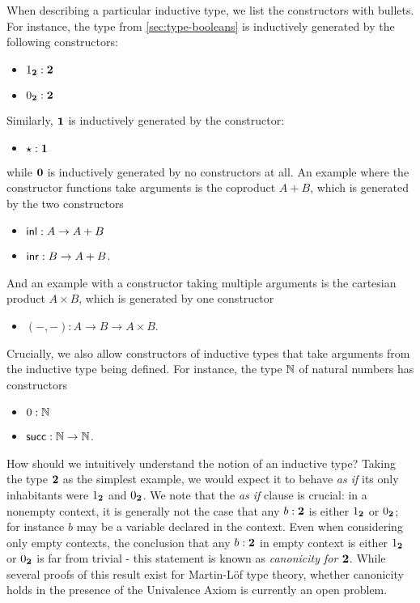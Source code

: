 When describing a particular inductive type, we list the constructors with bullets.
For instance, the type \bool from \autoref{sec:type-booleans} is inductively generated by the following constructors:
\begin{itemize}
\item $1_{\mathbf{2}}:\mathbf{2}$
\item $0_{\mathbf{2}}:\mathbf{2}$
\end{itemize}
Similarly, $\mathbf{1}$ is inductively generated by the constructor:
\begin{itemize}
\item $\star:\mathbf{1}$
\end{itemize}
while $\mathbf{0}$ is inductively generated by no constructors at all.
An example where the constructor functions take arguments is the coproduct $A+B$, which is generated by the two constructors
\begin{itemize}
\item $\mathsf{inl}:A\to A+B$
\item $\mathsf{inr}:B\to A+B$.
\end{itemize}
And an example with a constructor taking multiple arguments is the cartesian product $A\times B$, which is generated by one constructor
\begin{itemize}
\item $(-,-) : A\to B \to A\times B$.
\end{itemize}
Crucially, we also allow constructors of inductive types that take arguments from the inductive type being defined.
For instance, the type $\mathbb{N}$ of natural numbers has constructors
\begin{itemize}
\item $0:\mathbb{N}$
\item $\mathsf{succ}:\mathbb{N}\to\mathbb{N}$.
\end{itemize}

How should we intuitively understand the notion of an inductive type? Taking the type $\mathbf{2}$ as the simplest example, we would expect it to behave \emph{as if} its only inhabitants were $1_{\mathbf{2}}$ and $0_{\mathbf{2}}$. We note that the \emph{as if} clause is crucial: in a nonempty context, it is generally not the case that any $b : \mathbf{2}$ is either $1_{\mathbf{2}}$ or $0_{\mathbf{2}}$; for instance $b$ may be a variable declared in the context. Even when considering only empty contexts, the conclusion that any $b : \mathbf{2}$ in empty context is either $1_{\mathbf{2}}$ or $0_{\mathbf{2}}$ is far from trivial - this statement is known as \emph{canonicity for $\mathbf{2}$}. While several proofs of this result exist for Martin-L{\"o}f type theory, whether canonicity holds in the presence of the Univalence Axiom is currently an open problem.


